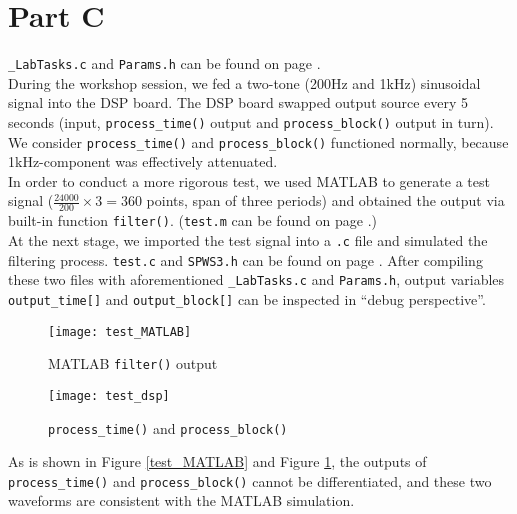 \documentclass{article}
\newenvironment{homeworkProblem}[1]{
	\section*{#1}
	}{
}
\begin{document}
\begin{homeworkProblem}{Part C}

\texttt{\_LabTasks.c} and \texttt{Params.h} can be found on page \pageref{Params_h}.\\

During the workshop session, we fed a two-tone (200Hz and 1kHz) sinusoidal signal into the DSP board. The DSP board swapped output source every 5 seconds (input, \texttt{process\_time()} output and \texttt{process\_block()} output in turn). We consider \texttt{process\_time()} and \texttt{process\_block()} functioned normally, because 1kHz-component was effectively attenuated.\\

In order to conduct a more rigorous test, we used MATLAB to generate a test signal ($\frac{24000}{200} \times 3 = 360$ points, span of three periods) and obtained the output via built-in function \texttt{filter()}. (\texttt{test.m} can be found on page \pageref{test_m}.)\\

At the next stage, we imported the test signal into a \texttt{.c} file and simulated the filtering process. \texttt{test.c} and \texttt{SPWS3.h} can be found on page \pageref{test_c}. After compiling these two files with aforementioned \texttt{\_LabTasks.c} and \texttt{Params.h}, output variables \texttt{output\_time[]} and \texttt{output\_block[]} can be inspected in ``debug perspective''.

\begin{figure}[H]
\begin{minipage}[t]{0.5\linewidth}
\centering
\texttt{[image: test\_MATLAB]}
\caption{MATLAB \texttt{filter()} output}
\label{test_MATLAB}
\end{minipage}
\begin{minipage}[t]{0.5\linewidth}
\centering
\texttt{[image: test\_dsp]}
\caption{\texttt{process\_time()} and \texttt{process\_block()}}
\label{test_dsp}
\end{minipage}
\end{figure}

As is shown in Figure \ref{test_MATLAB} and Figure \ref{test_dsp}, the outputs of \texttt{process\_time()} and \texttt{process\_block()} cannot be differentiated, and these two waveforms are consistent with the MATLAB simulation.
\end{homeworkProblem}

\end{document}
